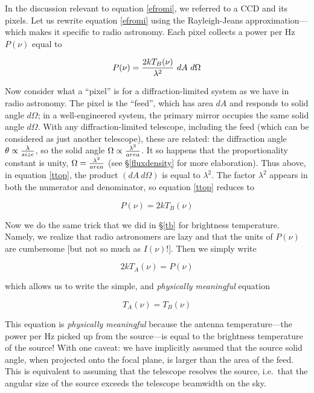 \documentclass[psfig,preprint]{aastex}
\begin{document}
	In the discussion relevant to equation \ref{efromi}, we referred
to a CCD and its pixels. Let us rewrite equation \ref{efromi} using the
Rayleigh-Jeans approximation---which makes it specific to radio
astronomy. Each pixel collects a power per Hz $P(\nu)$ equal to

\begin{equation} \label{ttop}
P(\nu) =  {2 k T_B(\nu) \over \lambda^2} ~ dA ~ d\Omega
\end{equation}

	Now consider what a ``pixel'' is for a diffraction-limited
system as we have in radio astronomy. The pixel is the ``feed'', which
has area $dA$ and responds to solid angle $d \Omega$; in a
well-engineered system, the primary mirror occupies the same solid angle
$d \Omega$. With any diffraction-limited telescope, including the feed
(which can be considered as just another telescope), these are related:
the diffraction angle $\theta \propto {\lambda \over size}$, so the
solid angle $\Omega \propto  { \lambda^2 \over area} $.
It so happens that the proportionality constant is unity, $\Omega
=  { \lambda^2 \over area} $ (see \S \ref{fluxdensity} for more
elaboration). Thus above, in equation \ref{ttop}, the product $(dA ~
d\Omega)$ is equal to $\lambda^2$. The factor $\lambda^2$ appears in
both the numerator and denominator, so equation \ref{ttop} reduces to

\begin{equation} \label{pwrnu}
P(\nu) = 2kT_B(\nu)
\end{equation}

	Now we do the same trick that we did in \S \ref{tb} for
brightness temperature. Namely, we realize that radio astronomers are
lazy and that the units of $P(\nu)$ are cumbersome [but not so much as
$I(\nu)$!]. Then we simply write

\begin{equation}
2kT_A(\nu) = P(\nu)
\end{equation}

\noindent which allows us to write the simple, and {\it physically
meaningful} equation

\begin{equation}
T_A(\nu) = T_B(\nu)
\end{equation}

	This equation is {\it physically meaningful} because the antenna
temperature---the power per Hz picked up from the source---is equal to
the brightness temperature of the source! With one caveat: we have
implicitly assumed that the source solid angle, when projected onto the
focal plane, is larger than the area of the feed. This is equivalent to
assuming that the telescope resolves the source, i.e.\ that the angular
size of the source exceeds the telescope beamwidth on the sky.
\end{document}
